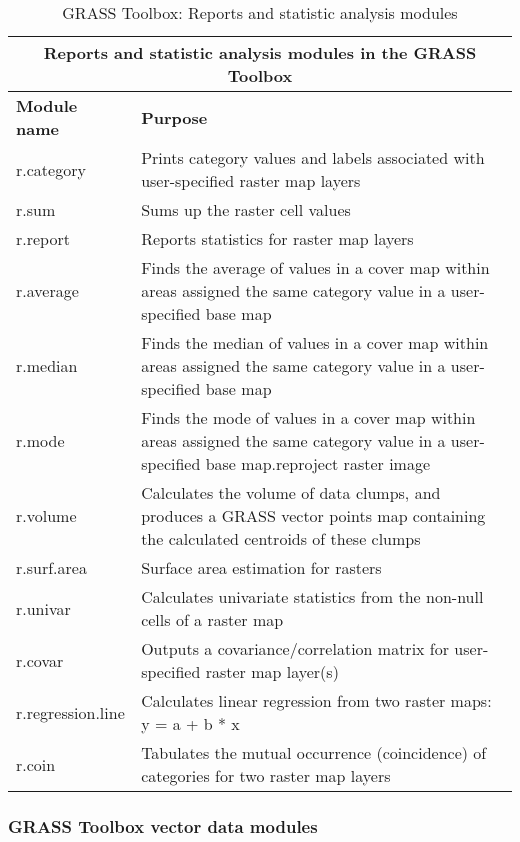 \begin{table}[ht]
\centering
\caption{GRASS Toolbox: Reports and statistic analysis modules}\medskip
 \begin{tabular}{|p{4cm}|p{12cm}|}
  \hline \multicolumn{2}{|c|}{\textbf{Reports and statistic analysis modules in the GRASS Toolbox}} \\
  \hline \textbf{Module name} & \textbf{Purpose} \\
  \hline r.category & Prints category values and labels associated with
  user-specified raster map layers \\
  \hline r.sum & Sums up the raster cell values \\
  \hline r.report & Reports statistics for raster map layers \\
  \hline r.average & Finds the average of values in a cover map within areas
  assigned the same category value in a user-specified base map \\
  \hline r.median & Finds the median of values in a cover map within areas
  assigned the same category value in a user-specified base map \\
  \hline r.mode & Finds the mode of values in a cover map within areas
  assigned the same category value in a user-specified base map.reproject
  raster image \\
  \hline r.volume & Calculates the volume of data clumps, and produces a
  GRASS vector points map containing the calculated centroids of these clumps \\
  \hline r.surf.area & Surface area estimation for rasters \\
  \hline r.univar & Calculates univariate statistics from the non-null cells
  of a raster map \\
  \hline r.covar & Outputs a covariance/correlation matrix for user-specified
  raster map layer(s)\\
  \hline r.regression.line & Calculates linear regression from two raster
  maps: y = a + b * x \\
  \hline r.coin & Tabulates the mutual occurrence (coincidence) of categories
  for two raster map layers\\
\hline
\end{tabular}
\end{table}

\clearpage

\subsubsection{GRASS Toolbox vector data modules}

